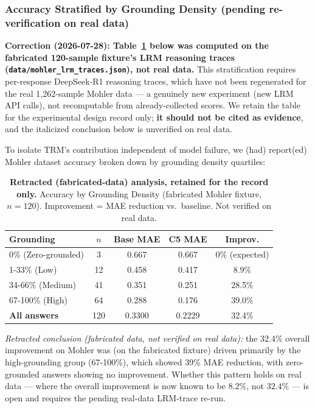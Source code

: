 \documentclass[journal,review]{vgtc}
\begin{document}
\subsubsection{Accuracy Stratified by Grounding Density (pending re-verification on real data)}

\textbf{Correction (2026-07-28): Table~\ref{tab:grounding_ablation} below
was computed on the fabricated 120-sample fixture's LRM reasoning traces
(\texttt{data/mohler\_lrm\_traces.json}), not real data.} This
stratification requires per-response DeepSeek-R1 reasoning traces, which
have not been regenerated for the real 1{,}262-sample Mohler data ---
a genuinely new experiment (new LRM API calls), not recomputable from
already-collected scores. We retain the table for the experimental
design record only; \textbf{it should not be cited as evidence}, and the
italicized conclusion below is unverified on real data.

To isolate TRM's contribution independent of model failure, we (had) report(ed) Mohler dataset accuracy broken down by grounding density quartiles:

\begin{table}[ht]
\centering
\caption{\textbf{Retracted (fabricated-data) analysis, retained for the record only.} Accuracy by Grounding Density (fabricated Mohler fixture, $n=120$). Improvement = MAE reduction vs.\ baseline. Not verified on real data.}
\label{tab:grounding_ablation}
\small
\begin{tabular}{lcccc}
\toprule
\textbf{Grounding} & \textbf{$n$} & \textbf{Base MAE} & \textbf{C5 MAE} & \textbf{Improv.} \\
\midrule
0\% (Zero-grounded) & 3 & 0.667 & 0.667 & 0\% (expected) \\
1-33\% (Low) & 12 & 0.458 & 0.417 & 8.9\% \\
34-66\% (Medium) & 41 & 0.351 & 0.251 & 28.5\% \\
67-100\% (High) & 64 & 0.288 & 0.176 & 39.0\% \\
\toprule
\textbf{All answers} & 120 & 0.3300 & 0.2229 & 32.4\% \\
\bottomrule
\end{tabular}
\end{table}

\textit{Retracted conclusion (fabricated data, not verified on real
data):} the 32.4\% overall improvement on Mohler was (on the fabricated
fixture) driven primarily by the high-grounding group (67-100\%), which
showed 39\% MAE reduction, with zero-grounded answers showing no
improvement. Whether this pattern holds on real data --- where the
overall improvement is now known to be $8.2\%$, not $32.4\%$ --- is open
and requires the pending real-data LRM-trace re-run.
\end{document}
